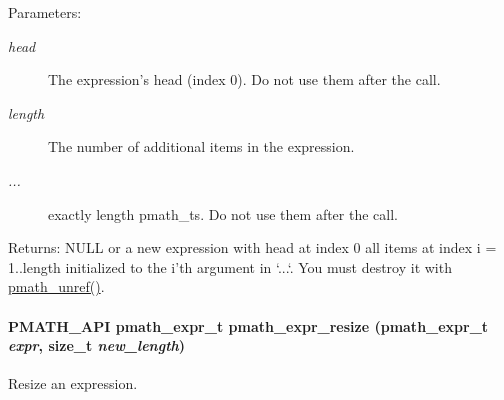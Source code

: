 \begin{Desc}
\item[Parameters:]
\begin{description}
\item[{\em head}]The expression's head (index 0). Do not use them after the call. \item[{\em length}]The number of additional items in the expression. \item[{\em ...}]exactly length pmath\_\-ts. Do not use them after the call. \end{description}
\end{Desc}
\begin{Desc}
\item[Returns:]NULL or a new expression with head at index 0 all items at index i = 1..length initialized to the i'th argument in `...`. You must destroy it with \hyperlink{classpmath__t_54e905402c38940687033b87eb8c6c9f}{pmath\_\-unref()}. \end{Desc}
\hypertarget{group__expressions_g781924a3e0164cc27e703b486517ab4c}{
\paragraph[{pmath\_\-expr\_\-resize}]{\setlength{\rightskip}{0pt plus 5cm}PMATH\_\-API {\bf pmath\_\-expr\_\-t} pmath\_\-expr\_\-resize ({\bf pmath\_\-expr\_\-t} {\em expr}, \/  size\_\-t {\em new\_\-length})}\hfill}
\label{group__expressions_g781924a3e0164cc27e703b486517ab4c}


Resize an expression. 

